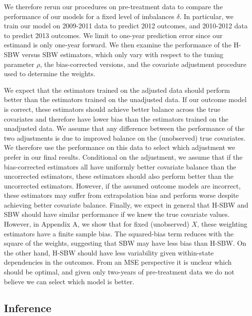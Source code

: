 \documentclass[article]{imsart}
\theoremstyle{plain}
\theoremstyle{remark}
\begin{document}
We therefore rerun our procedures on pre-treatment data to compare the performance of our models for a fixed level of imbalances $\delta$. In particular, we train our model on 2009-2011 data to predict 2012 outcomes, and 2010-2012 data to predict 2013 outcomes. We limit to one-year prediction error since our estimand is only one-year forward. We then examine the performance of the H-SBW versus SBW estimators, which only vary with respect to the tuning parameter $\rho$, the bias-corrected versions, and the covariate adjustment procedure used to determine the weights. 

We expect that the estimators trained on the adjusted data should perform better than the estimators trained on the unadjusted data. If our outcome model is correct, these estimators should achieve better balance across the true covariates and therefore have lower bias than the estimators trained on the unadjusted data. We assume that any difference between the performance of the two adjustments is due to improved balance on the (unobserved) true covariates. We therefore use the performance on this data to select which adjustment we prefer in our final results. Conditional on the adjustment, we assume that if the bias-corrected estimators all have uniformly better covariate balance than the uncorrected estimators, these estimators should also perform better than the uncorrected estimators. However, if the assumed outcome models are incorrect, these estimators may suffer from extrapolation bias and perform worse despite achieving better covariate balance. Finally, we expect in general that H-SBW and SBW should have similar performance if we knew the true covariate values. However, in Appendix A, we show that for fixed (unobserved) $X$, these weighting estimators have a finite sample bias. The squared-bias term reduces with the square of the weights, suggesting that SBW may have less bias than H-SBW. On the other hand, H-SBW should have less variability given within-state dependencies in the outcomes. From an MSE perspective it is unclear which should be optimal, and given only two-years of pre-treatment data we do not believe we can select which model is better.

\subsection{Inference}
\end{document}

